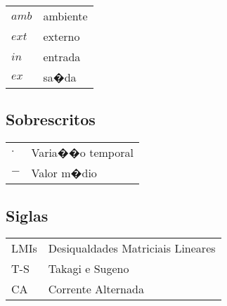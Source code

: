 \begin{tabular}{p{}p{}}
$amb$	& ambiente \\
$ext$	& externo \\
$in$	& entrada \\
$ex$	& sa�da \\
\end{tabular}

\subsection*{Sobrescritos}

\begin{tabular}{p{}p{}}
$\cdot$	& Varia��o temporal \\
$-$	& Valor m�dio
\end{tabular}

\subsection*{Siglas}

\begin{tabular}{p{}p{}}
LMIs	& Desiqualdades Matriciais Lineares\\
T-S 	& Takagi e Sugeno\\
CA 	& Corrente Alternada
\end{tabular}

